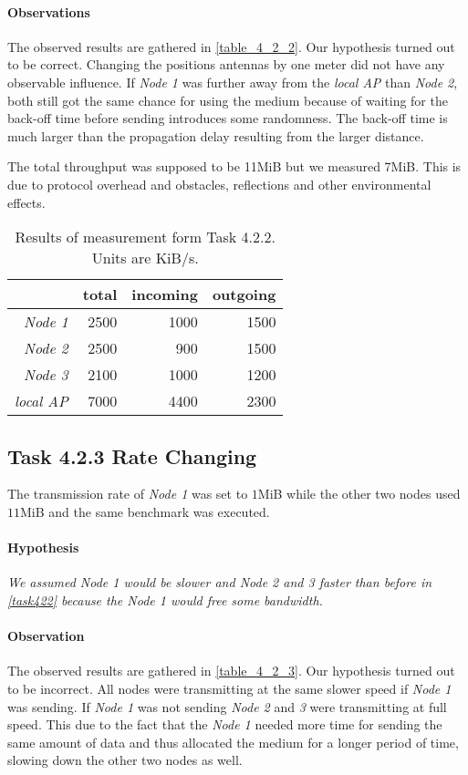 \documentclass[12pt,a4paper]{article}
\begin{document}
\paragraph{Observations}
The observed results are gathered in \autoref{table_4_2_2}.
Our hypothesis turned out to be correct.
Changing the positions antennas by one meter did not have any observable influence. If \emph{Node 1} was further away from the \emph{local AP} than \emph{Node 2}, both still got the same chance for using the medium because of waiting for the back-off time before sending introduces some randomness. The back-off time is much larger than the propagation delay resulting from the larger distance.

The total throughput was supposed to be 11MiB but we measured 7MiB. This is due to protocol overhead and obstacles, reflections and other environmental effects.
	\begin{table}
	\begin{center}
		\begin{tabular}{r|r|r|r}\
		 & total & incoming & outgoing \\
		 \hline 
		 \emph{Node 1} & 2500 & 1000 & 1500 \\
		 \emph{Node 2} & 2500 & 900 & 1500 \\
		 \emph{Node 3} & 2100 & 1000 & 1200 \\
		 \emph{local AP} & 7000 & 4400& 2300\\
		\end{tabular}
		\label{table_4_2_2}
		\caption{Results of measurement form Task 4.2.2. Units are KiB/s.}
		
	\end{center}
	\end{table}


\subsection{Task 4.2.3 Rate Changing}
The transmission rate of \emph{Node 1} was set to $1$MiB while the other two nodes used $11$MiB and the same benchmark was executed.

\paragraph{Hypothesis}
\emph{We assumed \emph{Node 1} would be slower and \emph{Node 2} and \emph{3} faster than before in \autoref{task422} because the \emph{Node 1} would free some bandwidth.}

\paragraph{Observation}
The observed results are gathered in \autoref{table_4_2_3}.
Our hypothesis turned out to be incorrect.
All nodes were transmitting at the same slower speed if \emph{Node 1} was sending.
If \emph{Node 1} was not sending \emph{Node 2} and \emph{3} were transmitting at full speed.
This due to the fact that the \emph{Node 1} needed more time for sending the same amount of data and thus allocated the medium for a longer period of time, slowing down the other two nodes as well.
\end{document}
